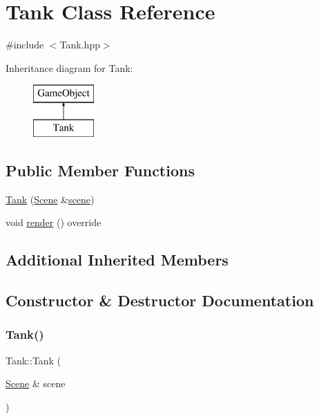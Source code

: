 \hypertarget{class_tank}{}\section{Tank Class Reference}
\label{class_tank}


{\ttfamily \#include $<$Tank.\+hpp$>$}

Inheritance diagram for Tank\+:\begin{figure}[H]
\begin{center}
\leavevmode
\includegraphics[height=2.000000cm]{class_tank}
\end{center}
\end{figure}
\subsection*{Public Member Functions}
\begin{DoxyCompactItemize}
\item 
\mbox{\hyperlink{class_tank_a7eec1b8b0587dff258a1ea2b66b85be1}{Tank}} (\mbox{\hyperlink{class_scene}{Scene}} \&\mbox{\hyperlink{class_game_object_aeea61de934e13603696b4ed00e9fe42e}{scene}})
\item 
void \mbox{\hyperlink{class_tank_a9628f999ddc963311cebf069da363d5c}{render}} () override
\end{DoxyCompactItemize}
\subsection*{Additional Inherited Members}


\subsection{Constructor \& Destructor Documentation}
\mbox{\label{class_tank_a7eec1b8b0587dff258a1ea2b66b85be1}} 
\subsubsection{\texorpdfstring{Tank()}{Tank()}}
{\footnotesize\ttfamily Tank\+::\+Tank (\begin{DoxyParamCaption}\item[{\mbox{\hyperlink{class_scene}{Scene}} \&}]{scene }\end{DoxyParamCaption})}



